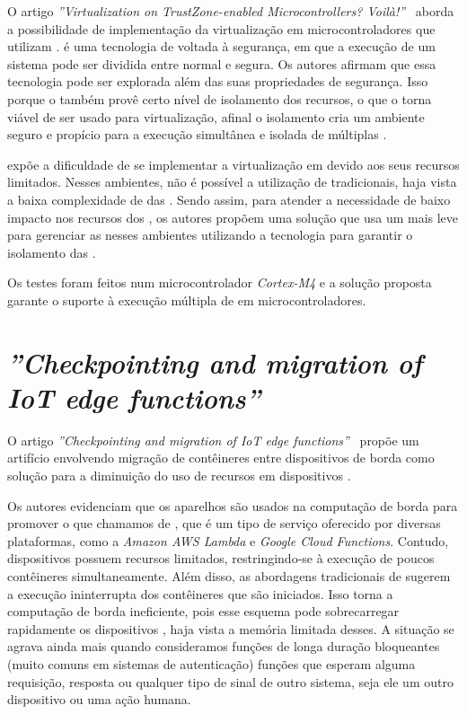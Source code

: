 O artigo \textit{''Virtualization on TrustZone-enabled Microcontrollers? Voilà!''}~\cite{pinto2019virtualization} aborda a possibilidade de implementação da virtualização em microcontroladores que utilizam \trustzone. \trustzone é uma tecnologia de \hardware voltada à segurança, em que a execução de um sistema pode ser dividida entre normal e segura. Os autores afirmam que essa tecnologia pode ser explorada além das suas propriedades de segurança. Isso porque o \trustzone também provê certo nível de isolamento dos recursos, o que o torna viável de ser usado para virtualização, afinal o isolamento cria um ambiente seguro e propício para a execução simultânea e isolada de múltiplas \vms.

 expõe a dificuldade de se implementar a virtualização em \mcus devido aos seus recursos limitados. Nesses ambientes, não é possível a utilização de \hypervisors tradicionais, haja vista a baixa complexidade de \hardware das \mcus. Sendo assim, para atender a necessidade de baixo impacto nos recursos dos \mcus, os autores propõem uma solução que usa um \hypervisor mais leve para gerenciar as \vms nesses ambientes utilizando a tecnologia \trustzone para garantir o isolamento das \vms.

Os testes foram feitos num microcontrolador \textit{Cortex-M4} e a solução proposta garante o suporte à execução múltipla de \vms em microcontroladores.

\section{\textit{''Checkpointing and migration of IoT edge functions''}}\label{sec.rw-2}


O artigo \textit{''Checkpointing and migration of IoT edge functions''}~\cite{karhula2019checkpointing} propõe um artifício envolvendo migração de contêineres entre dispositivos \iot de borda como solução para a diminuição do uso de recursos em dispositivos \iot.

Os autores evidenciam que os aparelhos \iot são usados na computação de borda para promover o que chamamos de \faas, que é um tipo de serviço oferecido por diversas plataformas, como a \textit{Amazon AWS Lambda} e \textit{Google Cloud Functions}. Contudo, dispositivos \iot possuem recursos limitados, restringindo-se à execução de poucos contêineres simultaneamente. Além disso, as abordagens tradicionais de \faas sugerem a execução ininterrupta dos contêineres que são iniciados. Isso torna a computação de borda ineficiente, pois esse esquema pode sobrecarregar rapidamente os dispositivos \iot, haja vista a memória limitada desses. A situação se agrava ainda mais quando consideramos funções de longa duração bloqueantes (muito comuns em sistemas de autenticação) \eg funções que esperam alguma requisição, resposta ou qualquer tipo de sinal de outro sistema, seja ele um outro dispositivo \iot ou uma ação humana.


